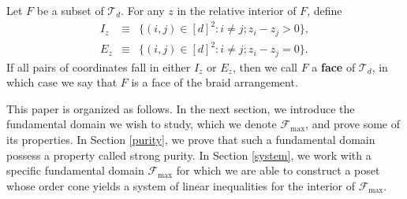 \begin{defn}
Let $F$ be a subset of $\mathcal{T}_d$. For any $z$ in the relative interior of $F$, define \begin{eqnarray*} I_z &\equiv &\{(i,j) \in [d]^2 : i \neq j; z_i - z_j > 0 \},\\ E_z &\equiv &\{(i,j) \in [d]^2 : i \neq j; z_i - z_j = 0\}. \end{eqnarray*} If all pairs of coordinates fall in either $I_z$ or $E_z$, then we call $F$ a \textbf{face} of $\mathcal{T}_d$, in which case we say that $F$ is a face of the braid arrangement.
\end{defn}

This paper is organized as follows. In the next section, we introduce the fundamental domain we wish to study, which we denote \(\mathcal{F}_{\max}\), and prove some of its properties. In Section \ref{purity}, we prove that such a fundamental domain possess a property called strong purity. In Section \ref{system}, we work with a specific fundamental domain \(\mathcal{F}_{\max}\) for which we are able to construct a poset whose order cone yields a system of linear inequalities for the interior of \(\mathcal{F}_{\max}\).
